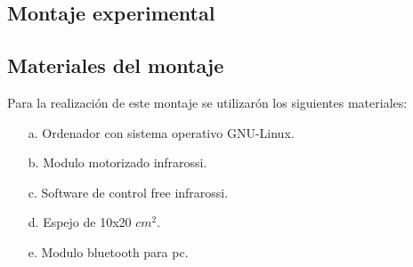 \documentclass[12]{article}
\begin{document}
\begin{multicols}{2}
\section{Montaje experimental}
\subsection{Materiales del montaje}
Para la realización de este montaje se utilizarón los siguientes materiales:
\begin{enumerate}
\item[a.] Ordenador con sistema operativo GNU-Linux.
\item[b.] Modulo motorizado infrarossi.
\item[c.] Software de control free infrarossi.
\item[d.] Espejo de 10x20 $cm^{2}$.
\item[e.] Modulo bluetooth para pc.
\end{enumerate}

\end{multicols}
\end{document}
